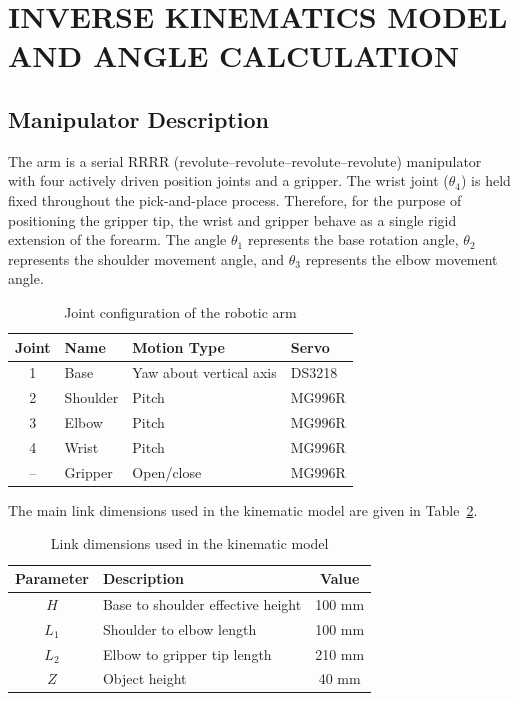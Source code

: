 \section{INVERSE KINEMATICS MODEL AND ANGLE CALCULATION}

\subsection{Manipulator Description}

The arm is a serial RRRR (revolute--revolute--revolute--revolute) manipulator with four actively driven position joints and a gripper. The wrist joint ($\theta_4$) is held fixed throughout the pick-and-place process. Therefore, for the purpose of positioning the gripper tip, the wrist and gripper behave as a single rigid extension of the forearm. The angle $\theta_1$ represents the base rotation angle, $\theta_2$ represents the shoulder movement angle, and $\theta_3$ represents the elbow movement angle.

\begin{table}[htbp]
    \centering
    \caption{Joint configuration of the robotic arm}
    \label{tab:joint_configuration}
    \begin{tabular}{c l l l}
        \toprule
        Joint & Name & Motion Type & Servo \\
        \midrule
        1 & Base & Yaw about vertical axis & DS3218 \\
        2 & Shoulder & Pitch & MG996R \\
        3 & Elbow & Pitch & MG996R \\
        4 & Wrist & Pitch & MG996R \\
        -- & Gripper & Open/close & MG996R \\
        \bottomrule
    \end{tabular}
\end{table}

The main link dimensions used in the kinematic model are given in Table~\ref{tab:link_details}.

\begin{table}[htbp]
    \centering
    \caption{Link dimensions used in the kinematic model}
    \label{tab:link_details}
    \begin{tabular}{c l c}
        \toprule
        Parameter & Description & Value \\
        \midrule
        $H$ & Base to shoulder effective height & 100 mm \\
        $L_1$ & Shoulder to elbow length & 100 mm \\
        $L_2$ & Elbow to gripper tip length & 210 mm \\
        $Z$ & Object height & 40 mm \\
        \bottomrule
    \end{tabular}
\end{table}

